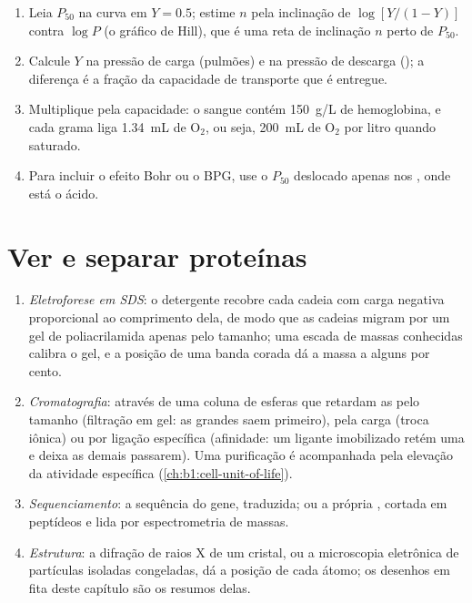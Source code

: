 \begin{method}\label{met:b1:proteins:hill}
\begin{enumerate}
  \item Leia $P_{50}$ na curva em $Y = 0.5$; estime $n$ pela inclinação
        de $\log[Y/(1-Y)]$ contra $\log P$ (o gráfico de Hill), que é
        uma reta de inclinação $n$ perto de $P_{50}$.
  \item Calcule $Y$ na pressão de carga (pulmões) e na pressão de
        descarga (); a diferença é a fração da capacidade de
        transporte que é entregue.
  \item Multiplique pela capacidade: o sangue contém \qty{150}{g/L} de
        hemoglobina, e cada grama liga \qty{1.34}{mL} de
        $\mathrm{O_2}$, ou seja, \qty{200}{mL} de $\mathrm{O_2}$ por
        litro quando saturado.
  \item Para incluir o efeito Bohr ou o BPG, use o $P_{50}$ deslocado
        apenas nos , onde está o ácido.
\end{enumerate}
\end{method}

\section{Ver e separar proteínas}

\begin{method}\label{met:b1:proteins:methods}
\begin{enumerate}
  \item \emph{Eletroforese em SDS}: o detergente recobre cada cadeia com
        carga negativa proporcional ao comprimento dela, de modo que as
        cadeias migram por um gel de poliacrilamida apenas pelo tamanho;
        uma escada de massas conhecidas calibra o gel, e a posição de
        uma banda corada dá a massa a alguns por cento.
  \item \emph{Cromatografia}: através de uma coluna de esferas que
        retardam as  pelo tamanho (filtração em gel: as grandes
        saem primeiro), pela carga (troca iônica) ou por ligação
        específica (afinidade: um ligante imobilizado retém uma 
        e deixa as demais passarem). Uma purificação é acompanhada pela
        elevação da atividade específica
        (\cref{ch:b1:cell-unit-of-life}).
  \item \emph{Sequenciamento}: a sequência do gene, traduzida; ou a
        própria , cortada em peptídeos e lida por espectrometria
        de massas.
  \item \emph{Estrutura}: a difração de raios X de um cristal, ou a
        microscopia eletrônica de partículas isoladas congeladas, dá a
        posição de cada átomo; os desenhos em fita deste capítulo são os
        resumos delas.
\end{enumerate}
\end{method}

